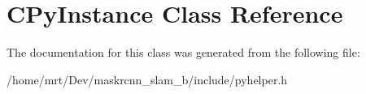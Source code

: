 \hypertarget{classCPyInstance}{}\section{C\+Py\+Instance Class Reference}
\label{classCPyInstance}


The documentation for this class was generated from the following file\+:\begin{DoxyCompactItemize}
\item 
/home/mrt/\+Dev/maskrcnn\+\_\+slam\+\_\+b/include/pyhelper.\+h\end{DoxyCompactItemize}
